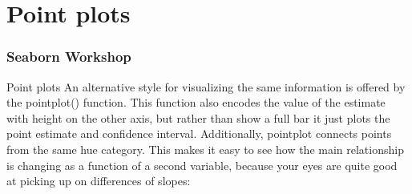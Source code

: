 \documentclass{beamer}
\begin{document}
\section{Point plots}
\begin{frame}[fragile]
	\frametitle{Seaborn Workshop}
Point plots
An alternative style for visualizing the same information is offered by the pointplot() function. This function also encodes the value of the estimate with height on the other axis, but rather than show a full bar it just plots the point estimate and confidence interval. Additionally, pointplot connects points from the same hue category. This makes it easy to see how the main relationship is changing as a function of a second variable, because your eyes are quite good at picking up on differences of slopes:
\end{frame}
\end{document}
